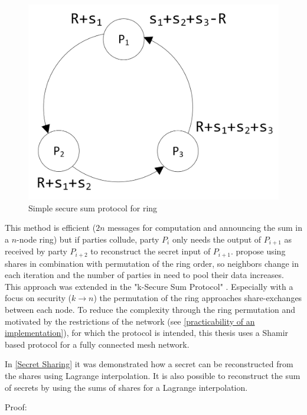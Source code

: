 \begin{figure}[!htb] %
	\caption{Simple secure sum protocol for ring} \label{figure:smpc sum ring}
	\includegraphics[scale=1.0]{figures/smpc-sum-simple-ring.png}
\end{figure}

This method is efficient ($2n$ messages for computation and announcing the sum in a $n$-node ring) but if parties collude, party $P_i$ only needs the output of $P_{i+1}$ as received by party $P_{i+2}$ to reconstruct the secret input of $P_{i+1}$. \textcite{Clifton2002} propose using shares in combination with permutation of the ring order, so neighbors change in each iteration and the number of parties in need to pool their data increases. This approach was extended in the "k-Secure Sum Protocol" \autocite{Sheikh2009}. Especially with a focus on security ($k\rightarrow n$) the permutation of the ring approaches share-exchanges between each node. To reduce the complexity through the ring permutation and motivated by the restrictions of the network (see \autoref{practicability of an implementation}), for which the protocol is intended, this thesis  uses a Shamir based protocol for a fully connected mesh network. 

In \ref{Secret Sharing} it was demonstrated how a secret can be reconstructed from the shares using Lagrange interpolation. It is also possible to reconstruct the sum of secrets by using the sums of shares for a Lagrange interpolation.

Proof:

